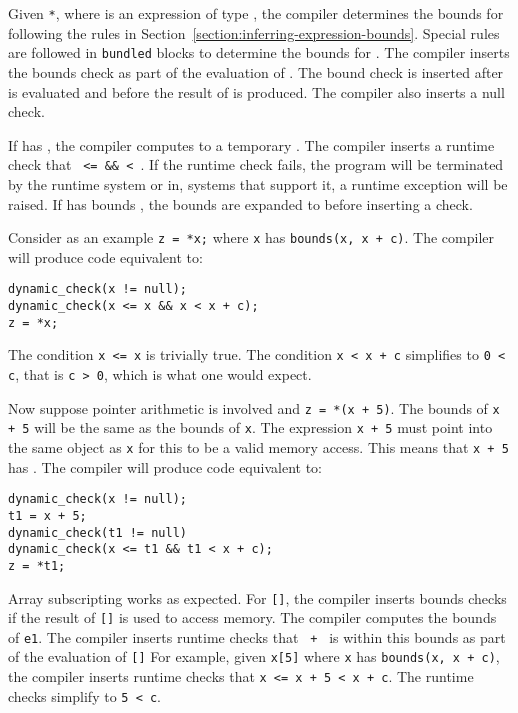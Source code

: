 Given \texttt{*}, where  is an expression of type
\arrayptr, the compiler determines the bounds for 
following the rules in Section~\ref{section:inferring-expression-bounds}.
Special rules are followed in
\texttt{bundled} blocks to determine the bounds for . The
compiler inserts the bounds check as part of the evaluation of .
The bound check is inserted after  is evaluated and before the result of
 is produced.  The compiler also inserts a null check.

If {} has {}, the compiler
computes  to a temporary .   The compiler inserts a runtime check that
\texttt{ <=  \&\&
 < }. If the runtime check fails, the program
will be terminated by the runtime system or in, systems that support it,
a runtime exception will be raised.   If {} has bounds {},
the bounds are expanded to  before inserting a check.

Consider as an example \lstinline|z = *x;| where
\lstinline|x| has \lstinline|bounds(x, x + c)|. The compiler will produce code equivalent to:
\begin{lstlisting}
dynamic_check(x != null);
dynamic_check(x <= x && x < x + c);
z = *x;
\end{lstlisting}
The condition \texttt{x <= x} is trivially true. The
condition \texttt{x < x + c} simplifies to \texttt{0
< c}, that is \texttt{c > 0}, which is what one
would expect.

Now suppose pointer arithmetic is involved and \texttt{z = *(x + 5)}. The
bounds of \texttt{x + 5} will be the same as the bounds of \texttt{x}.
The expression \texttt{x + 5} must point into the same object as
\texttt{x} for this to be a valid memory access. This means that
{\texttt{x + 5}} has {}.
The compiler will produce code equivalent to:

\begin{lstlisting}
dynamic_check(x != null);
t1 = x + 5;
dynamic_check(t1 != null)
dynamic_check(x <= t1 && t1 < x + c);
z = *t1;
\end{lstlisting}

Array subscripting works as expected. For \texttt{[]}, the
compiler inserts bounds checks if the result of \texttt{[]}
is used to access memory.   The compiler computes the bounds of
\texttt{e1}. The compiler inserts
runtime checks that \texttt{ + } is within this bounds as
part of the evaluation of \texttt{[]} For example,
given \lstinline|x[5]| where \lstinline|x| has \lstinline|bounds(x, x + c)|, the
compiler inserts runtime checks that \lstinline|x <= x + 5 < x + c|. 
The runtime checks simplify to \lstinline|5 < c|.

